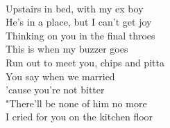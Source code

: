 \\
Upstairs in bed, with my ex boy \\
He's in a place, but I can't get joy \\
Thinking on you in the final throes \\
This is when my buzzer goes \\
Run out to meet you, chips and pitta \\
You say when we married \\
'cause you're not bitter \\
"There'll be none of him no more \\
I cried for you on the kitchen floor \\
